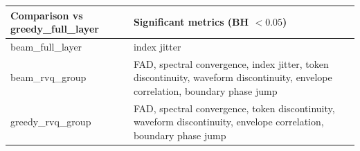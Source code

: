 \begin{tabular}{ll}
\toprule
Comparison vs greedy\_full\_layer & Significant metrics (BH $< 0.05$) \\
\midrule
beam\_full\_layer & index jitter \\
beam\_rvq\_group & FAD, spectral convergence, index jitter, token discontinuity, waveform discontinuity, envelope correlation, boundary phase jump \\
greedy\_rvq\_group & FAD, spectral convergence, token discontinuity, waveform discontinuity, envelope correlation, boundary phase jump \\
\bottomrule
\end{tabular}
